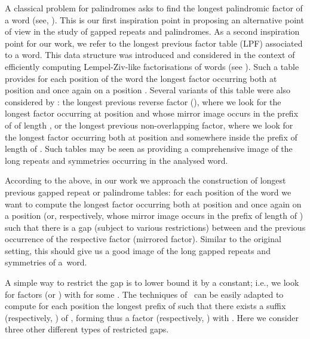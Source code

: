 \documentclass[final]{dmtcs-episciences}
\begin{document}
A classical problem for palindromes asks to find the longest palindromic factor of a word (see, \cite{Manacher}). This is our first inspiration point in proposing an alternative point of view in the study of gapped repeats and palindromes. As a second inspiration point for our work, we refer to the longest previous factor table (LPF) associated to a word. This data structure was introduced and considered in the context of efficiently computing Lempel-Ziv-like factorisations of words (see \cite{IlieLPF,power_of_SA}). Such a table provides for each position  of the word the longest factor occurring both at position  and once again on a position . Several variants of this table were also considered by \cite{power_of_SA}: the longest previous reverse factor (), where we look for the longest factor occurring at position  and whose mirror image occurs in the prefix of  of length , or the longest previous non-overlapping factor, where we look for the longest factor occurring both at position  and somewhere inside the prefix of length  of . Such tables may be seen as providing a comprehensive image of the long repeats and symmetries occurring in the analysed word. 

According to the above, in our work we approach the construction of longest previous gapped repeat or palindrome tables: for each position  of the word we want to compute the longest factor occurring both at position  and once again on a position  (or, respectively, whose mirror image occurs in the prefix of length  of ) such that there is a gap (subject to various restrictions) between  and the previous occurrence of the respective factor (mirrored factor). Similar to the original setting, this should give us a good image of the long gapped repeats and symmetries of a~word.

A simple way to restrict the gap is to lower bound it by a constant; i.e., we look for factors  (or ) with  for some . The techniques of~\cite{power_of_SA} can be easily adapted to compute for each position  the longest prefix  of  such that there exists a suffix  (respectively, ) of , forming thus a factor  (respectively, ) with . Here we consider three other different types of restricted gaps.
\end{document}
